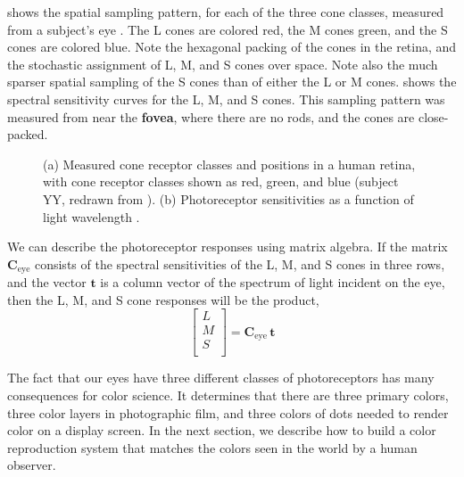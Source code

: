  shows 
the spatial sampling pattern, for each of the three cone classes, measured from a subject's eye \cite{Hofer2005}. The L cones are
colored red, the M cones green, and the S cones are colored
blue. Note the hexagonal packing of the cones in the retina, and the
stochastic assignment of L, M, and S cones over space.  Note also the much sparser spatial sampling of the S cones than of either the L or M cones.
 shows the spectral sensitivity curves
for the L, M, and S cones.  This sampling pattern was measured from near the {\bf fovea}, where there are no rods, and the cones are close-packed.


\begin{figure}[t]
\centerline{
}
\caption{
 (a)  Measured cone receptor classes and positions in a human retina, with cone receptor classes shown as red, green, and blue (subject YY, redrawn from \cite{Hofer2005}).
(b) Photoreceptor sensitivities as a function of light wavelength  \cite{Vanessaezekowitz2007}.}
\label{fig:ramon}
\end{figure}


We can describe the photoreceptor responses using matrix algebra.
If the matrix $\mathbf{C}_{\mbox{eye}}$ consists of the spectral sensitivities of the
L, M, and S cones in three rows, and the vector $\mathbf{t}$ is a column
vector of the spectrum of light incident on the eye, then the L, M,
and S cone responses will be the product,
\begin{equation}
    \begin{bmatrix}
    L  \\
    M  \\
    S \\
    \end{bmatrix}
= \mathbf{C}_{\mbox{eye}} \, \mathbf{t}
\label{eq:lmsct}
\end{equation}

The fact that our eyes have three different classes of photoreceptors
has many consequences for color science.  It determines that there are
three primary colors, three color layers in photographic film, and
three colors of dots needed to render color on a display screen.  In
the next section, we describe how to build a color reproduction system that matches the colors seen in the world by a human observer.

